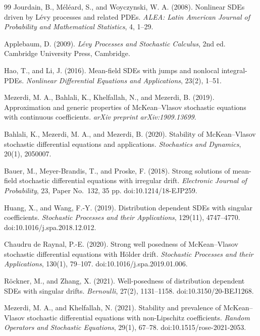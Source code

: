 \documentclass[12pt,oneside, reqno]{amsart}
\numberwithin{equation}{section}
\begin{document}
\begin{thebibliography}{99}
		Jourdain, B., M\'el\'eard, S., and Woyczynski, W. A. (2008). Nonlinear SDEs driven by L\'evy processes and related PDEs. {\it ALEA: Latin American Journal of Probability and Mathematical Statistics}, 4, 1--29.
		
		Applebaum, D. (2009). {\it L\'evy Processes and Stochastic Calculus}, 2nd ed. Cambridge University Press, Cambridge.
		
		Hao, T., and Li, J. (2016). Mean-field SDEs with jumps and nonlocal integral-PDEs. {\it Nonlinear Differential Equations and Applications}, 23(2), 1--51.
		
		Mezerdi, M. A., Bahlali, K., Khelfallah, N., and Mezerdi, B. (2019). Approximation and generic properties of McKean--Vlasov stochastic equations with continuous coefficients. {\it arXiv preprint arXiv:1909.13699}.
		
		Bahlali, K., Mezerdi, M. A., and Mezerdi, B. (2020). Stability of McKean--Vlasov stochastic differential equations and applications. {\it Stochastics and Dynamics}, 20(1), 2050007.
		
		Bauer, M., Meyer-Brandis, T., and Proske, F. (2018).
		Strong solutions of mean-field stochastic differential equations with
		irregular drift. {\it Electronic Journal of Probability}, 23, Paper
		No.~132, 35 pp. doi:10.1214/18-EJP259.
		
		Huang, X., and Wang, F.-Y. (2019). Distribution dependent SDEs with
		singular coefficients. {\it Stochastic Processes and their Applications},
		129(11), 4747--4770. doi:10.1016/j.spa.2018.12.012.
		
		Chaudru de Raynal, P.-E. (2020). Strong well posedness of McKean--Vlasov
		stochastic differential equations with H\"older drift.
		{\it Stochastic Processes and their Applications}, 130(1), 79--107.
		doi:10.1016/j.spa.2019.01.006.
		
		R\"ockner, M., and Zhang, X. (2021). Well-posedness of distribution
		dependent SDEs with singular drifts. {\it Bernoulli}, 27(2), 1131--1158.
		doi:10.3150/20-BEJ1268.
		
		Mezerdi, M. A., and Khelfallah, N. (2021). Stability and prevalence of
		McKean--Vlasov stochastic differential equations with non-Lipschitz
		coefficients. {\it Random Operators and Stochastic Equations}, 29(1),
		67--78. doi:10.1515/rose-2021-2053.
		

\end{thebibliography}
\end{document}
